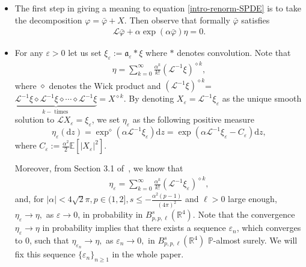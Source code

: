 \documentclass{article}
\newcommand{\assign}{:=}
\newcommand{\mathd}{\mathrm{d}}
\newcommand{\tmop}[1]{\ensuremath{\operatorname{#1}}}
\newenvironment{itemizedot}{\begin{itemize} \renewcommand{\labelitemi}{$\bullet$}\renewcommand{\labelitemii}{$\bullet$}\renewcommand{\labelitemiii}{$\bullet$}\renewcommand{\labelitemiv}{$\bullet$}}{\end{itemize}}
\begin{document}
\begin{itemizedot}
  \item The first step in giving a meaning to equation
  \eqref{intro-renorm-SPDE} is to take the decomposition $\varphi =
  \bar{\varphi} + X$. Then observe that formally $\bar{\varphi} $ satisfies
  \begin{equation}
    \begin{array}{l}
      \mathcal{L} \bar{\varphi} + \alpha \exp (\alpha \bar{\varphi}) \eta = 0.
    \end{array} \label{goodSPDE}
  \end{equation}
  \item For any $\varepsilon > 0$ let us set $\xi_{\varepsilon} \assign
  \mathfrak{a}_{\varepsilon} \ast \xi$ where $\ast$ denotes convolution. Note
  that
  \[ \begin{array}{l}
       \eta = \sum_{k = 0}^{\infty} \frac{\alpha^k}{k!}  (\mathcal{L}^{- 1}
       \xi)^{\diamond k},
     \end{array} \]
  where $\diamond$ denotes the Wick product and $(\mathcal{L}^{- 1} \xi)^{\diamond
  k}$= $\underbrace{\mathcal{L}^{- 1} \xi \diamond \mathcal{L}^{- 1} \xi
  \diamond \cdots \diamond \mathcal{L}^{- 1} \xi}_{k - \tmop{times}} =
  X^{\diamond k}$. By denoting $X_{\varepsilon} =\mathcal{L}^{- 1}
  \xi_{\varepsilon}$ as the unique smooth solution to
  $\mathcal{L}X_{\varepsilon} = \xi_{\varepsilon}$, we set
  $\eta_{\varepsilon}$ as the following positive measure
  \begin{equation}\label{def-eta-eps}
      \eta_{\varepsilon} (\mathd z) = \exp^{\diamond} (\alpha \mathcal{L}^{-
       1} \xi_{\varepsilon}) \mathd z = \exp (\alpha \mathcal{L}^{- 1}
       \xi_{\varepsilon} - C_{\varepsilon}) \mathd z,
  \end{equation}
  where $C_{\varepsilon} \assign \frac{\alpha^2}{2} \mathbb{E} [|
  X_{\varepsilon} |^2]$.
  
  Moreover, from Section 3.1 of~{\cite{AVG2021}}, we know that
  \[ \begin{array}{l}
       \eta_{\varepsilon} = \sum_{k = 0}^{\infty} \frac{\alpha^k}{k!} 
       (\mathcal{L}^{- 1} \xi_{\varepsilon})^{\diamond k},
     \end{array} \]
  and, for $| \alpha | < 4 \sqrt{2} \pi, p \in (1, 2], s \leqslant -
  \frac{\alpha^2 (p - 1)}{(4 \pi)^2}$ and $\ell > 0$ large enough, \
  $\eta_{\varepsilon} \rightarrow \eta,$ as $\varepsilon \rightarrow 0$, in
  probability in $B_{p, p, \ell}^s (\mathbb{R}^4) .$ Note that the convergence
  $\eta_{\varepsilon} \rightarrow \eta$ in probability implies that there
  exists a sequence $\varepsilon_n$, which converges to $0$, such that
  $\eta_{\varepsilon_n} \rightarrow \eta,$ as $\varepsilon_n \rightarrow 0,$
  in $B_{p, p, \ell}^s (\mathbb{R}^4)$ $\mathbb{P}$-almost surely. We will fix
  this sequence $\{ \varepsilon_n \}_{n \geqslant 1}$ in the whole paper. \
  

\end{itemizedot}
\end{document}
